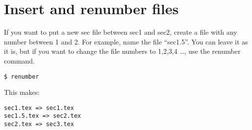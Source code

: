 \section{Insert and renumber files}

If you want to put a new sec file between sec1 and sec2, create a file
with any number between 1 and 2. For example, name the file ``sec1.5''.
You can leave it as it is, but if you want to change the file numbers to
1,2,3,4 \ldots, use the renumber command.

\begin{verbatim}
$ renumber
\end{verbatim}

This makes:

\begin{verbatim}
sec1.tex => sec1.tex
sec1.5.tex => sec2.tex
sec2.tex => sec3.tex
\end{verbatim}
